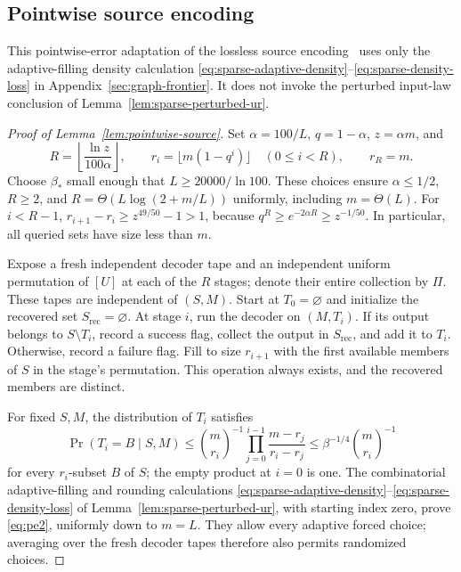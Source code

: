 \documentclass[11pt,letterpaper]{article}
\numberwithin{equation}{section}
\begin{document}
\subsection{Pointwise source encoding}
\label{app:pointwise-source-proof}

This pointwise-error adaptation of the lossless source encoding~\cite{KNPWWY2017,NelsonYu2019} uses only the adaptive-filling density calculation \eqref{eq:sparse-adaptive-density}--\eqref{eq:sparse-density-loss} in Appendix~\ref{sec:graph-frontier}.
It does not invoke the perturbed input-law conclusion of Lemma~\ref{lem:sparse-perturbed-ur}.

\begin{proof}[Proof of Lemma~\ref{lem:pointwise-source}]
Set $\alpha=100/L$, $q=1-\alpha$, $z=\alpha m$, and
\[
 R=\left\lfloor\frac{\ln z}{100\alpha}\right\rfloor,
 \qquad r_i=\lfloor m(1-q^i)\rfloor\quad(0\le i<R),
 \qquad r_R=m.
\]
Choose $\beta_*$ small enough that $L\ge20000/\ln100$.
These choices ensure $\alpha\le1/2$, $R\ge2$, and $R=\Theta(L\log(2+m/L))$ uniformly, including $m=\Theta(L)$.
For $i<R-1$, $r_{i+1}-r_i\ge z^{49/50}-1>1$, because $q^R\ge e^{-2\alpha R}\ge z^{-1/50}$.
In particular, all queried sets have size less than $m$.

Expose a fresh independent decoder tape and an independent uniform permutation of $[U]$ at each of the $R$ stages; denote their entire collection by $\Pi$.
These tapes are independent of $(S,M)$.
Start at $T_0=\varnothing$ and initialize the recovered set $S_{\mathrm{rec}}=\varnothing$.
At stage $i$, run the decoder on $(M,T_i)$.
If its output belongs to $S\setminus T_i$, record a success flag, collect the output in $S_{\mathrm{rec}}$, and add it to $T_i$.
Otherwise, record a failure flag.
Fill to size $r_{i+1}$ with the first available members of $S$ in the stage's permutation.
This operation always exists, and the recovered members are distinct.

For fixed $S,M$, the distribution of $T_i$ satisfies
\begin{equation}
\Pr(T_i=B\mid S,M)
 \le \binom{m}{r_i}^{-1}
       \prod_{j=0}^{i-1}\frac{m-r_j}{r_i-r_j}
 \le \beta^{-1/4}\binom{m}{r_i}^{-1}
 \label{eq:pe2}
\end{equation}
for every $r_i$-subset $B$ of $S$; the empty product at $i=0$ is one.
The combinatorial adaptive-filling and rounding calculations \eqref{eq:sparse-adaptive-density}--\eqref{eq:sparse-density-loss} of Lemma~\ref{lem:sparse-perturbed-ur}, with starting index zero, prove \eqref{eq:pe2}, uniformly down to $m=L$.
They allow every adaptive forced choice; averaging over the fresh decoder tapes therefore also permits randomized choices.


\end{proof}
\end{document}
